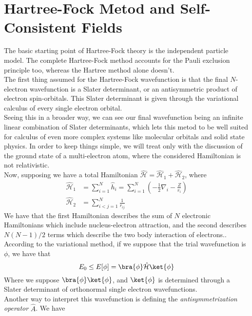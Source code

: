 \documentclass[a4paper, 11pt]{book}
\newcommand{\1}{\opr{\mathds{1}}}
\newcommand{\ham}{\mathcal{H}}
\newcommand{\opr}[1]{\hat{#1}}
\theoremstyle{plain}
\begin{document}
	\section{Hartree-Fock Metod and Self-Consistent Fields}
	The basic starting point of Hartree-Fock theory is the independent particle model. The complete Hartree-Fock method accounts for the Pauli exclusion principle too, whereas the Hartree method alone doesn't.\\
	The first thing assumed for the Hartree-Fock wavefunction is that the final $N$-electron wavefunction is a Slater determinant, or an antisymmetric product of electron spin-orbitals. This Slater determinant is given through the variational calculus of every single electron orbital.\\
	Seeing this in a broader way, we can see our final wavefunction being an infinite linear combination of Slater determinants, which lets this metod to be well suited for calculus of even more complex systems like molecular orbitals and solid state physics. In order to keep things simple, we will treat only with the discussion of the ground state of a multi-electron atom, where the considered Hamiltonian is not relativistic.\\
	Now, supposing we have a total Hamiltonian $\opr{\ham}=\opr{\ham}_1+\opr{\ham}_2$, where
	\begin{equation}
		\begin{aligned}
			\opr{\ham}_1&=\sum_{i=1}^N\opr{h}_i=\sum_{i=1}^N\left( -\frac{1}{2}\nabla_i-\frac{Z}{r_i} \right)\\
			\opr{\ham}_2&=\sum_{i<j=1}^N\frac{1}{r_{ij}}
		\end{aligned}
		\label{eq:hartreefockbaseham}
	\end{equation}
	We have that the first Hamiltonian describes the sum of $N$ electronic Hamiltonians which include nucleus-electron attraction, and the second describes $N(N-1)/2$ terms which describe the two body interaction of electrons..\\
	According to the variational method, if we suppose that the trial wavefunction is $\phi$, we have that
	\begin{equation*}
		E_0\le E[\phi]=\bra{\phi}\opr{\ham}\ket{\phi}
	\end{equation*}
	Where we suppose $\bra{\phi}\ket{\phi}$, and $\ket{\phi}$ is determined through a Slater determinant of orthonormal single electron wavefunctions.\\
	Another way to interpret this wavefunction is defining the \textit{antisymmetrization operator} $\opr{A}$. We have
\end{document}
